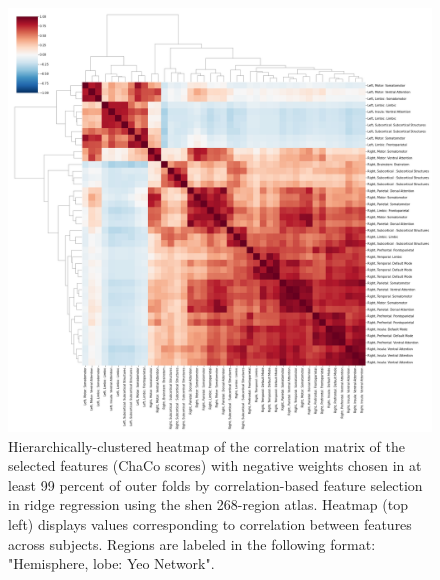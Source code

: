 \documentclass[10pt]{article}
\begin{document}
\begin{figure}[ht]
\centering
\includegraphics[width=1\linewidth]{figures/heatmap_shen268_correlation_negs.png}
\caption{Hierarchically-clustered heatmap of the correlation matrix of the selected features (ChaCo scores) with negative weights chosen in at least 99 percent of outer folds by correlation-based feature selection in ridge regression using the shen 268-region atlas. Heatmap (top left) displays values corresponding to correlation between features across subjects. Regions are labeled in the following format: "Hemisphere, lobe: Yeo Network".}
\label{heatmap_shen_negweights}
\end{figure}
\end{document}
